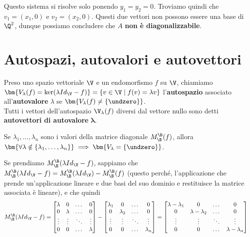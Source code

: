 \documentclass[11pt, a4paper, titlepage, oneside]{scrbook}
\begin{document}
Questo sistema si risolve solo ponendo $y_1 = y_2 = 0$. Troviamo quindi che $v_1 = (x_1, 0)$ e $v_2 = (x_2, 0)$. Questi due vettori non possono essere una base di $\Q^2$, dunque possiamo concludere che $A$ \textbf{non è diagonalizzabile}.

\section{Autospazi, autovalori e autovettori}

\begin{Definizione}
\label{def-autospazi-autovalori-autovettori}
Preso uno spazio vettoriale $\V$ e un endomorfismo $f$ su $\V$, chiamiamo \mbox{$\bm{V_\lambda(f) = \ker (\lambda Id_\V - f)} = \{v \in \V \mid f(v) = \lambda v\}$} l'\textbf{autospazio} associato all'\textbf{autovalore} $\lambda$ se $\bm{V_\lambda(f) \neq \{\undzero\}}$. \\
Tutti i vettori dell'autospazio $\V_\lambda(f)$ diversi dal vettore nullo sono detti \textbf{autovettori di autovalore} $\bm{\lambda}$. 
\end{Definizione}

\begin{Osservazione}[]
\label{oss-autospazio-lambda-fuori-matrice-diagonale}
Se $\lambda_1, \ldots, \lambda_n$ sono i valori della matrice diagonale $M_\B^\B(f)$, allora \mbox{$\bm{\forall \lambda \notin \{\lambda_1, \ldots, \lambda_n\}} \implies \bm{V_\lambda = \{\undzero\}}$}.
\end{Osservazione}

\Dimostrazione \nopagebreak

Se prendiamo $M_\B^\B(\lambda Id_\V - f)$, sappiamo che $M_\B^\B(\lambda Id_\V - f) = M_\B^\B(\lambda Id_\V) - M_\B^\B(f)$ (questo perché, l'applicazione che prende un'applicazione lineare e due basi del suo dominio e restituisce la matrice associata è lineare), e che quindi
\[M_\B^\B(\lambda Id_\V - f) = 
\begin{bmatrix}
    \lambda & 0 & \dots & 0 \\
    0 & \lambda & \dots & 0 \\
    \vdots & \vdots & \ddots & \vdots \\
    0 & 0 & \dots & \lambda
\end{bmatrix}
- \begin{bmatrix}
    \lambda_1 & 0 & \dots & 0 \\
    0 & \lambda_2 & \dots & 0 \\
    \vdots & \vdots & \ddots & \vdots \\
    0 & 0 & \dots & \lambda_n
\end{bmatrix}
=
\begin{bmatrix}
    \lambda - \lambda_1 & 0 & \dots & 0\\
    0 & \lambda - \lambda_2 & \dots & 0 \\ 
    \vdots & \vdots & \ddots & \vdots \\
    0 & 0 & \dots & \lambda - \lambda_n
\end{bmatrix}
\] 
\end{document}
